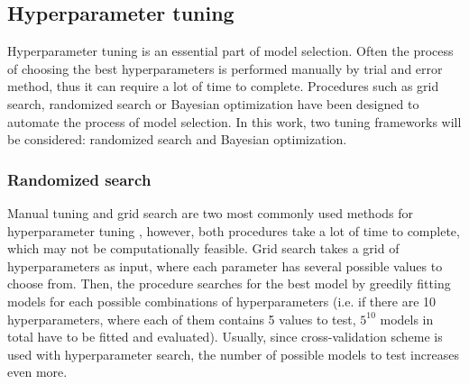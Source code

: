 \documentclass[magisterska, english]{pwr_wmat_praca_dyplomowa}
\theoremstyle{plain}
\numberwithin{theorem}{chapter}
\theoremstyle{definition}
\numberwithin{theorem}{chapter}
\begin{document}
\subsection{Hyperparameter tuning}
Hyperparameter tuning is an essential part of model selection. Often the process of choosing the best hyperparameters is performed manually by trial and error method, thus it can require a lot of time to complete. Procedures such as grid search, randomized search or Bayesian optimization have been designed to automate the process of model selection. In this work, two tuning frameworks will be considered: randomized search and Bayesian optimization.
\subsubsection{Randomized search}
Manual tuning and grid search are two most commonly used methods for hyperparameter tuning \cite{randomized}, however, both procedures take a lot of time to complete, which may not be computationally feasible. Grid search takes a grid of hyperparameters as input, where each parameter has several possible values to choose from. Then, the procedure searches for the best model by greedily fitting models for each possible combinations of hyperparameters (i.e. if there are 10 hyperparameters, where each of them contains 5 values to test, $5^{10}$ models in total have to be fitted and evaluated). Usually, since cross-validation scheme is used with hyperparameter search, the number of possible models to test increases even more.
\end{document}
